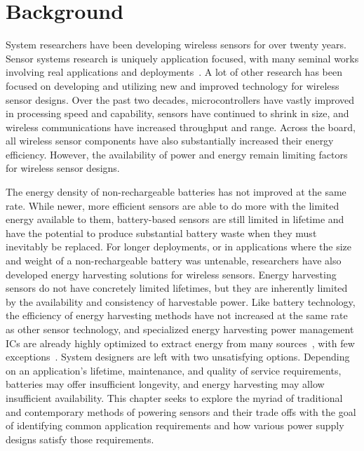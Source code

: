 \chapter{Background}
\label{chap:background}
System researchers have been developing wireless sensors for over twenty years.
Sensor systems research is uniquely application focused, with many seminal works involving real applications and deployments~\cite{juang2002energy,mainwaring2002wireless,tolle2005macroscope}.
A lot of other research has been focused on developing and utilizing new and improved technology for wireless sensor designs. 
Over the past two decades, microcontrollers have vastly improved in processing speed and capability, sensors have continued to shrink in size, and wireless communications have increased throughput and range.
Across the board, all wireless sensor components have also substantially increased their energy efficiency.
However, the availability of power and energy remain limiting factors for wireless sensor designs. 

The energy density of non-rechargeable batteries has not improved at the same rate. %
While newer, more efficient sensors are able to do more with the limited energy available to them, battery-based sensors are still limited in lifetime and have the potential to produce substantial battery waste when they must inevitably be replaced.
For longer deployments, or in applications where the size and weight of a non-rechargeable battery was untenable, researchers have also developed energy harvesting solutions for wireless sensors. 
Energy harvesting sensors do not have concretely limited lifetimes, but they are inherently limited by the availability and consistency of harvestable power.
Like battery technology, the efficiency of energy harvesting methods have not increased at the same rate as other sensor technology, and specialized energy harvesting power management ICs are already highly optimized to extract energy from many sources~\cite{adp5091,bq25505,matrix_prometheus}, with few exceptions~\cite{josephson2020farming,marcano2022soil}.
System designers are left with two unsatisfying options. 
Depending on an application's lifetime, maintenance, and quality of service requirements, batteries may offer insufficient longevity, and energy harvesting may allow insufficient availability. 
This chapter seeks to explore the myriad of traditional and contemporary methods of powering sensors and their trade offs 
with the goal of identifying common application requirements and how various power supply designs satisfy those requirements.

